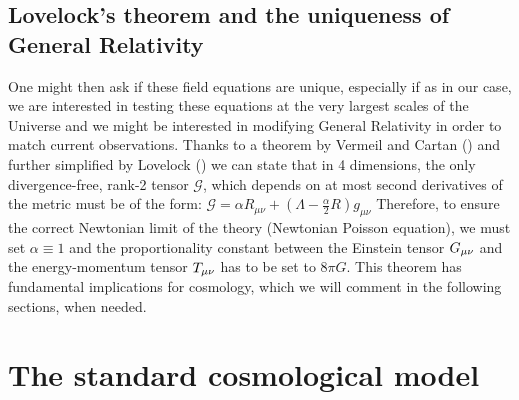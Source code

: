 \subsection*{Lovelock's theorem and the uniqueness of General Relativity}

One might then ask if these field equations are unique, especially if as in our case, 
we are interested in testing these equations at the very largest scales of the Universe and we might 
be interested in modifying General Relativity in order to match current observations.
Thanks to a theorem by Vermeil and Cartan (\cite{cite Vermeil, Cartan, 1921}) 
and further simplified by Lovelock (\cite{1970, Lovelock}) we can state that in 4 dimensions,
the only divergence-free, rank-2 tensor $\mathcal{G}$, which depends on at most second derivatives
of the metric must be of the form:
\beeqp$
\mathcal{G} =  \alpha R_{\mu \nu} + \left( \Lambda - \frac{\alpha}{2} R \right) g_{\mu \nu}
$
Therefore, to ensure the correct Newtonian limit of the theory (Newtonian Poisson equation), we must set $\alpha \equiv 1$
and the proportionality constant between the Einstein tensor $G_{\mu \nu}$  and the energy-momentum tensor
$T_{\mu \nu}$ has to be set to $8 \pi G$.
This theorem has fundamental implications for cosmology, which we will comment 
in the following sections, when needed.



\section{The standard cosmological model \label{sec:Standard-LCDM}}

